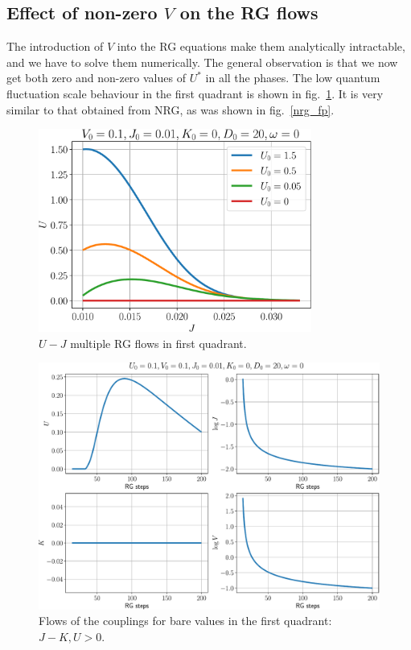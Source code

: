 \documentclass[twoside]{report}
\numberwithin{equation}{section}
\begin{document}
\subsection{Effect of non-zero \(V\) on the RG flows}
The introduction of \(V\) into the RG equations make them analytically intractable, and we have to solve them numerically. The general observation is that we now get both zero and non-zero values of \(U^*\) in all the phases. The low quantum fluctuation scale behaviour in the first quadrant is shown in fig.~\ref{Veffect}. It is very similar to that obtained from NRG, as was shown in fig.~\ref{nrg_fp}.
\begin{figure}[htpb]
	\centering
	\includegraphics[width=0.8\textwidth]{../figures/UvsJ_new.pdf}
	\caption{\(U-J\) multiple RG flows in first quadrant.}
	\label{Veffect}
\end{figure}

\begin{figure}[htpb!]
	\centering
	\includegraphics[width=\textwidth]{../figures/with_V_new.pdf}
	\caption{Flows of the couplings for bare values in the first quadrant: \(J-K,U>0\).}
\end{figure}
\end{document}
